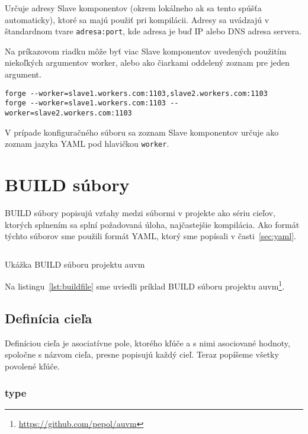 Určuje adresy Slave komponentov (okrem lokálneho ak sa tento spúšťa automaticky), ktoré
sa majú použiť pri kompilácii. Adresy sa uvádzajú v štandardnom tvare \texttt{adresa:port}, kde
adresa je buď IP alebo DNS adresa servera.

Na príkazovom riadku môže byť viac Slave komponentov uvedených použitím niekoľkých argumentov
worker, alebo ako čiarkami oddelený zoznam pre jeden argument.

\begin{verbatim}
forge --worker=slave1.workers.com:1103,slave2.workers.com:1103
forge --worker=slave1.workers.com:1103 --worker=slave2.workers.com:1103
\end{verbatim}

V prípade konfiguračného súboru sa zoznam Slave komponentov určuje ako
zoznam jazyka YAML pod hlavičkou \texttt{worker}.

\section{BUILD s\'{u}bory}
\label{sec:buildfiles}

BUILD súbory popisujú vzťahy medzi súbormi v projekte ako sériu cieľov, ktorých
splnením sa splní požadovaná úloha, najčastejšie kompilácia. Ako formát týchto
súborov sme použili formát YAML, ktorý sme popísali v časti~\ref{sec:yaml}.

\begin{listing}
  \inputminted[frame=lines, framesep=2mm,linenos,fontsize=\scriptsize,firstline=1,lastline=13]{yaml}{/home/pepol/src/auvm/build.yaml}
  \caption{Ukážka BUILD súboru projektu auvm}
  \label{lst:buildfile}
\end{listing}

Na listingu~\ref{lst:buildfile} sme uviedli príklad BUILD súboru projektu auvm\footnote{\url{https://github.com/pepol/auvm}}.

\subsection{Defin\'{i}cia cie\v{l}a}
\label{sec:buildfiles:targetdef}

Definíciou cieľa je asociatívne pole, ktorého kľúče a s nimi asociované hodnoty, spoločne
s názvom cieľa, presne popisujú každý cieľ. Teraz popíšeme všetky povolené kľúče.

\subsubsection{type}

